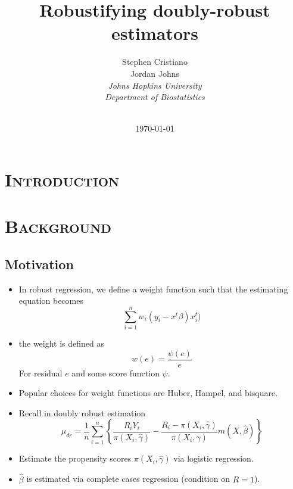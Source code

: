 \documentclass[xcolor=x11names,compress,table]{beamer}
\renewcommand{\(}{\begin{columns}}
\renewcommand{\)}{\end{columns}}
\newcommand{\<}[1]{\begin{column}{#1}}
\renewcommand{\>}{\end{column}}
\begin{document}
\section{\scshape Introduction}
\begin{frame}
\title[Nucleosomes]{Robustifying doubly-robust estimators }
\author{
    Stephen Cristiano\\
    Jordan Johns \\
    {\it Johns Hopkins University \\
        Department of Biostatistics }\\
}
\date{
    \\
        \vspace{1cm}
    \today
}
\titlepage
\end{frame}


\section{\scshape Background}
\subsection{Motivation}
\begin{frame}
\begin{itemize}
\item In robust regression, we define a weight function such that the estimating equation becomes $$\sum_{i=1}^n w_i (y_i -x^t\beta)x_i^t)$$
\item the weight is defined as
	$$ w(e) = \frac{\psi (e)}{e}$$
	For residual $e$ and some score function $\psi$. 
\item Popular choices for weight functions are Huber, Hampel, and bisquare.
\end{itemize}
\end{frame}

\begin{frame}
\begin{itemize}
\item Recall in doubly robust estimation
$$\hat{\mu}_{dr} = \frac{1}{n} \sum_{i=1}^n \left\{ \frac{R_i Y_i}{\pi(X_i, \hat{\gamma})} - \frac{R_i -  \pi(X_i, \hat{\gamma})}{\pi(X_i, \hat{\gamma})} m(X, \hat{\beta}) \right\}$$
\item Estimate the propensity scores $\pi(X_i, \hat{\gamma})$ via logistic regression.
\item $\hat{\beta}$ is estimated via complete cases regression (condition on $R=1$). 
\end{itemize}
\end{frame}
\end{document}
